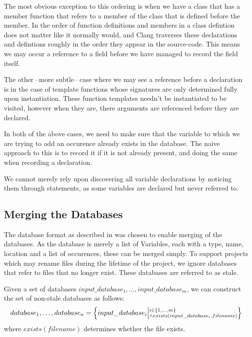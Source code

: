 The most obvious exception to this ordering is when we have a class that has a
member function that refers to a member of the class that is defined before the
member. In \CC{} the order of function definitions and members in a class
defintion does not matter like it normally would, and Clang traverses these
declarations and defintions roughly in the order they appear in the source-code.
This means we may occur a reference to a field before we have managed to record
the field itself.

The other --more subtle-- case where we may see a reference before a declaration
is in the case of template functions whose signatures are only determined fully
upon instantiation. These function templates needn't be instantiated to be
visited, however when they are, there arguments are referenced before they are
declared.

In both of the above cases, we need to make sure that the variable to which we
are trying to add an occurence already exists in the database. The naive
approach to this is to record it if it is not already present, and doing the
same when recording a declaration.

We cannot merely rely upon discovering all variable declarations by noticing
them through statements, as some variables are declared but never referred to.

\subsection{Merging the Databases}
\label{sec:dbmerge}

The database format as described in  was chosen to enable
merging of the databases.
As the database is merely a list of Variables, each with a type, name, location
and a list of occurences, these can be merged simply.
To support projects which may rename files during the lifetime of the project,
we ignore databases that refer to files that no longer exist. These databases
are referred to as stale.

Given a set of databases $input\_database_1, \ldots, input\_database_m$, we can
construct the set of non-stale databases as follows:
\begin{equation}
	database_1, \ldots, database_n = \left \{
			input\_database_i \middle|
		\begin{subarray}{l}
			i \in \left \{ 1, \ldots, m \right \} \\
			\land exists(input\_database_i.filename)
		\end{subarray}
	\right \}
\end{equation}
where $exists(filename)$ determines whether the file exists.

